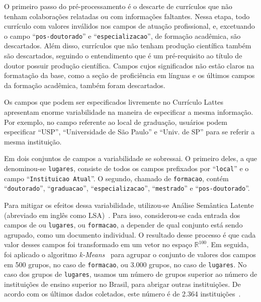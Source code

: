 \documentclass[12pt]{article}
\begin{document}
O primeiro passo do pré-processamento é o descarte de currículos que não tenham colaborações relatadas ou com informações faltantes.
Nessa etapa, todo currículo com valores inválidos nos campos de atuação profissional, e, excetuando o campo ``\texttt{pos-doutorado}'' e ``\texttt{especializacao}'', de formação acadêmica, são descartados.
Além disso, currículos que não tenham produção científica também são descartados, seguindo o entendimento que é um pré-requisito ao título de doutor possuir produção científica.
Campos cujos significados não estão claros na formatação da base, como a seção de proficiência em línguas e os últimos campos da formação acadêmica, também foram descartados.

Os campos que podem ser especificados livremente no Currículo Lattes apresentam enorme variabilidade na maneira de especificar a mesma informação.
Por exemplo, no campo referente ao local de graduação, usuários podem especificar ``USP'', ``Universidade de São Paulo'' e ``Univ. de SP'' para se referir a mesma instituição.

Em dois conjuntos de campos a variabilidade se sobressai.
O primeiro deles, a que denominou-se \texttt{lugares}, consiste de todos os campos prefixados por ``\texttt{local}'' e o campo ``\texttt{Instituicao Atual}''.
O segundo, chamado de \texttt{formacao}, contém ``\texttt{doutorado}'', ``\texttt{graduacao}'', ``\texttt{especializacao}'', ``\texttt{mestrado}'' e ``\texttt{pos-doutorado}''.

Para mitigar os efeitos dessa variabilidade, utilizou-se Análise Semântica Latente (abreviado em inglês como LSA)~\cite{lsa}.
Para isso, considerou-se cada entrada dos campos de ou \texttt{lugares}, ou \texttt{formacao}, a depender de qual conjunto está sendo agrupado, como um documento individual.
O resultado desse processo é que cada valor desses campos foi transformado em um vetor no espaço $\mathbb{R}^{100}$.
Em seguida, foi aplicado o algoritmo \emph{k-Means}~\cite{k-means} para agrupar o conjunto de valores dos campos em 500 grupos, no caso de \texttt{formacao}, ou 3.000 grupos, no caso de \texttt{lugares}.
No caso dos grupos de \texttt{lugares}, usamos um número de grupos superior ao número de instituições de ensino superior no Brasil, para abrigar outras instituições.
De acordo com os últimos dados coletados, este número é de 2.364 instituições~\cite{censo-mec}.
\end{document}
